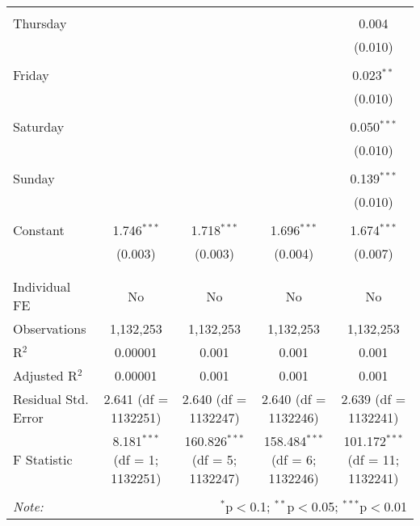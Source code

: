\documentclass[
]{article}
\begin{document}
\begin{table}[!htbp]
{\begin{tabular}{@{\extracolsep{5pt}}lcccc}
  & & & & \\ 
 Thursday &  &  &  & 0.004 \\ 
  &  &  &  & (0.010) \\ 
  & & & & \\ 
 Friday &  &  &  & 0.023$^{**}$ \\ 
  &  &  &  & (0.010) \\ 
  & & & & \\ 
 Saturday &  &  &  & 0.050$^{***}$ \\ 
  &  &  &  & (0.010) \\ 
  & & & & \\ 
 Sunday &  &  &  & 0.139$^{***}$ \\ 
  &  &  &  & (0.010) \\ 
  & & & & \\ 
 Constant & 1.746$^{***}$ & 1.718$^{***}$ & 1.696$^{***}$ & 1.674$^{***}$ \\ 
  & (0.003) & (0.003) & (0.004) & (0.007) \\ 
  & & & & \\ 
\hline \\[-1.8ex] 
Individual FE & No & No & No & No \\ 
Observations & 1,132,253 & 1,132,253 & 1,132,253 & 1,132,253 \\ 
R$^{2}$ & 0.00001 & 0.001 & 0.001 & 0.001 \\ 
Adjusted R$^{2}$ & 0.00001 & 0.001 & 0.001 & 0.001 \\ 
Residual Std. Error & 2.641 (df = 1132251) & 2.640 (df = 1132247) & 2.640 (df = 1132246) & 2.639 (df = 1132241) \\ 
F Statistic & 8.181$^{***}$ (df = 1; 1132251) & 160.826$^{***}$ (df = 5; 1132247) & 158.484$^{***}$ (df = 6; 1132246) & 101.172$^{***}$ (df = 11; 1132241) \\ 
\hline 
\hline \\[-1.8ex] 
\textit{Note:}  & \multicolumn{4}{r}{$^{*}$p$<$0.1; $^{**}$p$<$0.05; $^{***}$p$<$0.01} \\ 
\end{tabular}
} 
\end{table} 
\newpage
\end{document}
